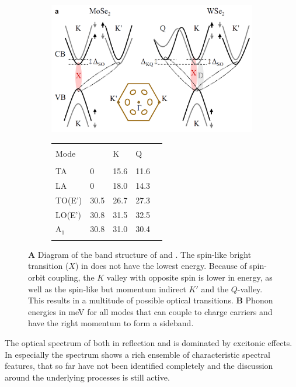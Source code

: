 \begin{figure}[t]
\centering
\begin{subfigure}{0.69\textwidth}
	\caption{}
	\includegraphics[width=.8\textwidth]{Band_structure_momentum_dark}
\end{subfigure}
\begin{subfigure}{0.3\textwidth}
	\caption{}
	\begin{tabular}{lllll}
	\hline
	\hline\\
	Mode&\Gamma&K&Q\\
	\hline\\
	TA&0&15.6&11.6\\
	LA&0&18.0&14.3\\
	TO(E')&30.5&26.7&27.3\\
	LO(E')&30.8&31.5&32.5\\
	A$_1$&30.8&31.0&30.4\\
	\\\hline
	\end{tabular}
\end{subfigure}
\caption{\textbf{A} Diagram of the band structure of \mose and \wse\!. The spin-like bright transition ($X$) in \wse does not have the lowest energy. Because of spin-orbit coupling, the $K$ valley with opposite spin is lower in energy, as well as the spin-like but momentum indirect $K'$ and the $Q$-valley. This results in a multitude of possible optical transitions. \textbf{B} Phonon energies in meV for all modes that can couple to charge carriers and have the right momentum to form a sideband\cite{jin_intrinsic_2014}.}\label{phonon_band}
\end{figure}

The optical spectrum of \tmds both in reflection and \pl is dominated by excitonic effects. In \wse especially the \pl spectrum shows a rich ensemble of characteristic spectral features, that so far have not been identified completely and the discussion around the underlying processes is still active.

